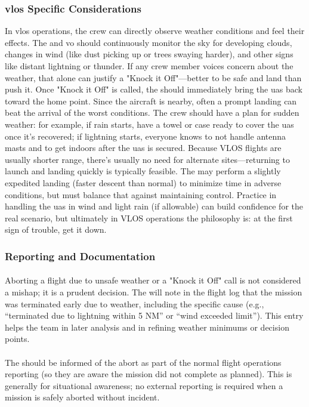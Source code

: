             \subsubsection{\ac{vlos} Specific Considerations} In \ac{vlos} operations, the crew can directly observe weather conditions and feel their effects. The  and \ac{vo} should continuously monitor the sky for developing clouds, changes in wind (like dust picking up or trees swaying harder), and other signs like distant lightning or thunder. If any crew member voices concern about the weather, that alone can justify a "Knock it Off"—better to be safe and land than push it. Once "Knock it Off" is called, the  should immediately bring the \ac{uas} back toward the home point. Since the aircraft is nearby, often a prompt landing can beat the arrival of the worst conditions. The crew should have a plan for sudden weather: for example, if rain starts, have a towel or case ready to cover the \ac{uas} once it’s recovered; if lightning starts, everyone knows to not handle antenna masts and to get indoors after the \ac{uas} is secured. Because VLOS flights are usually shorter range, there’s usually no need for alternate sites—returning to launch and landing quickly is typically feasible. The  may perform a slightly expedited landing (faster descent than normal) to minimize time in adverse conditions, but must balance that against maintaining control. Practice in handling the \ac{uas} in wind and light rain (if allowable) can build confidence for the real scenario, but ultimately in VLOS operations the philosophy is: at the first sign of trouble, get it down.
            
            \subsubsection{Reporting and Documentation}
                \paragraph{} Aborting a flight due to unsafe weather or a "Knock it Off" call is not considered a mishap; it is a prudent decision. The  will note in the flight log that the mission was terminated early due to weather, including the specific cause (e.g., “terminated due to lightning within 5 NM” or “wind exceeded limit”). This entry helps the team in later analysis and in refining weather minimums or decision points.
                \paragraph{} The  should be informed of the abort as part of the normal flight operations reporting (so they are aware the mission did not complete as planned). This is generally for situational awareness; no external reporting is required when a mission is safely aborted without incident.
